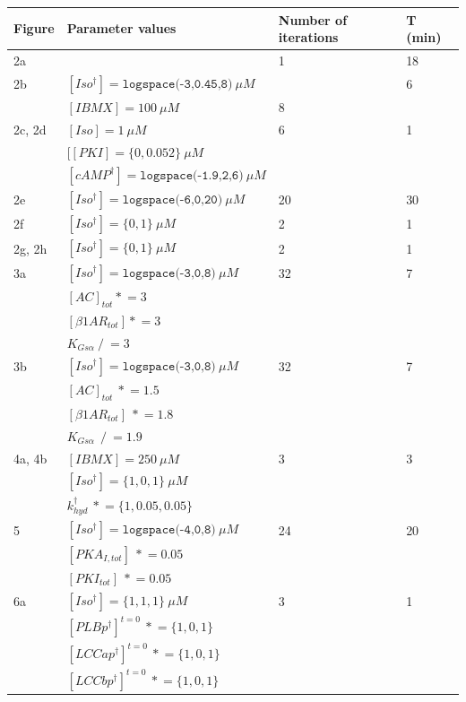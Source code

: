 \documentclass[fleqn,10pt]{physiome}
\newcommand{\asteq}{\mathrel{*}=}
\newcommand{\diveq}{\mathrel{/}=}
\begin{document}
\begin{table}
\begin{tabular}{|l|l|l|l|}
\hline
Figure & Parameter values & Number of iterations & T (min)  \\ 
\hline
2a &  & 1 & 18 \\ 
\hline
2b & $[Iso^\dagger] = \texttt{logspace(-3,0.45,8)}\ \mu M$ & & 6 \\ 
 & $[IBMX] = 100\ \mu M$ & 8 & \\ 
\hline
2c, 2d & $[Iso] = 1\ \mu M$ & 6 & 1 \\ 
 & $[[PKI] = \{0, 0.052\}\ \mu M$ & & \\
 & $[cAMP^\dagger] = \texttt{logspace(-1.9,2,6)}\ \mu M$ & & \\
\hline
2e & $[Iso^\dagger] = \texttt{logspace(-6,0,20)}\ \mu M$ & 20 & 30 \\ \hline
2f & $[Iso^\dagger] = \{0, 1\}\ \mu M$ & 2 & 1 \\
\hline
2g, 2h & $[Iso^\dagger] = \{0, 1\}\ \mu M$ & 2 & 1 \\
\hline
3a & $[Iso^\dagger] = \texttt{logspace(-3,0,8)}\ \mu M$ & 32 & 7 \\
& $[AC]_{tot} \asteq 3$  &  & \\
 &  $[\beta1AR_{tot}] \asteq 3$  &  & \\
 &  $K_{Gs\alpha } \diveq 3$ &  & \\
\hline
3b & $[Iso^\dagger] = \texttt{logspace(-3,0,8)}\ \mu M$ & 32 & 7 \\
& $[AC]_{tot}\ \asteq 1.5$  & & \\
 &  $[\beta1AR_{tot}]\ \asteq 1.8$  & & \\
 &  $K_{Gs\alpha }\ \diveq 1.9$ & & \\
\hline
4a, 4b & $[IBMX] = 250\ \mu M$ & 3 & 3 \\
& $[Iso^\dagger] = \{1,0,1\}\ \mu M$ &  &  \\
& $k_{hyd}^\dagger\ \asteq \{1,0.05,0.05\} $ &  &  \\
\hline
5 & $[Iso^\dagger] = \texttt{logspace(-4,0,8)}\ \mu M$ & 24 & 20 \\
& $[PKA_{I,tot}]\ \asteq0.05$ & & \\
& $[PKI_{tot}]\ \asteq0.05$ & & \\
\hline
6a & $[Iso^\dagger] = \{1,1,1\}\ \mu M$ & 3 & 1 \\
& $[PLBp^\dagger]^{t=0} \ \asteq \{1,0,1\}$ & & \\
& $[LCCap^\dagger]^{t=0} \ \asteq \{1,0,1\}$ & & \\
& $[LCCbp^\dagger]^{t=0} \ \asteq \{1,0,1\}$ & & \\

\end{tabular}
\end{table}
\end{document}
